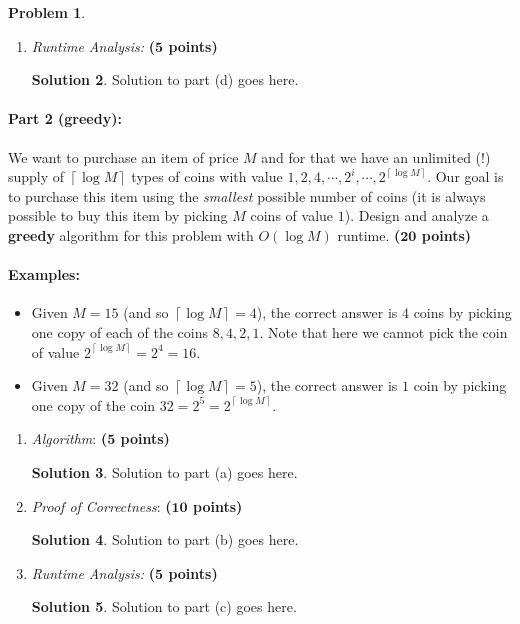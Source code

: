 \documentclass{article}
\theoremstyle{definition}
\newtheorem{problem}{Problem}
\newtheorem*{solution*}{Solution}
\newenvironment{solution}{\begin{solution*}}{{} \end{solution*}}
\newcommand{\grade}[1]{\hfill{\textbf{($\mathbf{#1}$ points)}}}
\newcommand{\ceil}[1]{{\left\lceil{#1}\right\rceil}}
\begin{document}
\begin{problem}
\begin{enumerate}[label=(\alph*)]
	\bigskip	
	\begin{solution}
	Solution to part (c) goes here. 
	\end{solution}
	
	\item \emph{Runtime Analysis:} \grade{5}
	
	\bigskip	
	\begin{solution}
	Solution to part (d) goes here. 
	\end{solution}
	
	
\end{enumerate}


\newpage
\paragraph{Part 2 (greedy):} 
	We want to purchase an item of price $M$ and for that we have an unlimited (!) supply of $\ceil{\log{M}}$ types of coins with value $1,2,4,\cdots,2^{i},\cdots,2^{\ceil{\log{M}}}$. 
	Our goal is to purchase this item using the \emph{smallest} possible number of coins (it is always possible to buy this item by picking $M$ coins of value $1$).
	Design and analyze a \textbf{greedy} algorithm for this problem with $O(\log{M})$ runtime. \grade{20}

	\paragraph{Examples:} 
	\begin{itemize}
		\item Given $M=15$ (and so $\ceil{\log{M}} = 4$), the correct answer is $4$ coins by picking one copy of each of the coins $8,4,2,1$. Note that here we cannot pick the coin of value $2^{\ceil{\log{M}}} = 2^{4} = 16$.
		\item Given $M=32$ (and so $\ceil{\log{M}} = 5$), the correct answer is $1$ coin by picking one copy of the coin $32 = 2^{5} = 2^{\ceil{\log{M}}}$. 

	\end{itemize}
		
		\begin{enumerate}[label=(\alph*)]
	\item \emph{Algorithm}: \grade{5}
	
	\bigskip
				\begin{solution}
	Solution to part (a) goes here. 
	\end{solution}
	
	
	\newpage
	\item \emph{Proof of Correctness}: \grade{10}
	\bigskip
				\begin{solution}
	Solution to part (b) goes here. 
	\end{solution}
	
	\bigskip
	
	\item \emph{Runtime Analysis:} \grade{5}
	\bigskip
				\begin{solution}
	Solution to part (c) goes here. 
	\end{solution}
	
	
\end{enumerate}

\end{problem}
\end{document}
